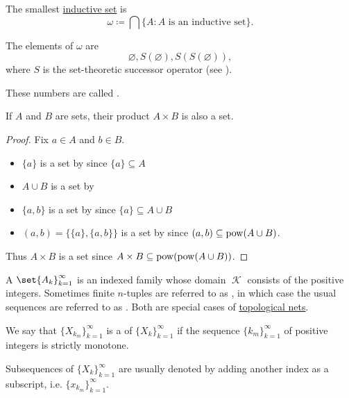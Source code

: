 \begin{definition}\label{def:smallest_inductive_set}
  The smallest \hyperref[def:inductive_set]{inductive set} is
  \begin{equation*}
    \omega \coloneqq \bigcap \{ A \colon A \text{ is an inductive set} \}.
  \end{equation*}

  The elements of \( \omega \) are
  \begin{equation*}
    \varnothing, S(\varnothing), S(S(\varnothing)),
  \end{equation*}
  where \( S \) is the set-theoretic successor operator (see ).

  These numbers are called .
\end{definition}

\begin{proposition}\label{thm:binary_cartesian_product_is_set}
  If \( A \) and \( B \) are sets, their product \( A \times B \) is also a set.
\end{proposition}
\begin{proof}
  Fix \( a \in A \) and \( b \in B \).
  \begin{itemize}
    \item \( \{ a \} \) is a set by  since \( \{ a \} \subseteq A \)
    \item \( A \cup B \) is a set by 
    \item \( \{ a, b \} \) is a set by  since \( \{ a \} \subseteq A \cup B \)
    \item \( (a, b) = \{ \{ a \}, \{ a, b \} \} \) is a set by  since \( (a, b) \subseteq \operatorname{pow}(A \cup B) \).
  \end{itemize}

  Thus \( A \times B \) is a set since \( A \times B \subseteq \operatorname{pow}(\operatorname{pow}(A \cup B)) \).
\end{proof}

\begin{definition}\label{def:sequence}
  A  \( \set{ A_k }_{k=1}^\infty \) is an indexed family whose domain \( \mscrK \) consists of the positive integers. Sometimes finite \( n \)-tuples are referred to as , in which case the usual sequences are referred to as . Both are special cases of \hyperref[def:topological_net]{topological nets}.

  We say that \( \{ X_{k_m} \}_{k=1}^\infty \) is a  of \( \{ X_k \}_{k=1}^\infty \) if the sequence \( \{ k_m \}_{k=1}^\infty \) of positive integers is strictly monotone.

  Subsequences of \( \{ X_k \}_{k=1}^\infty \) are usually denoted by adding another index as a subscript, i.e. \( \{ x_{k_m} \}_{k=1}^\infty \).
\end{definition}

